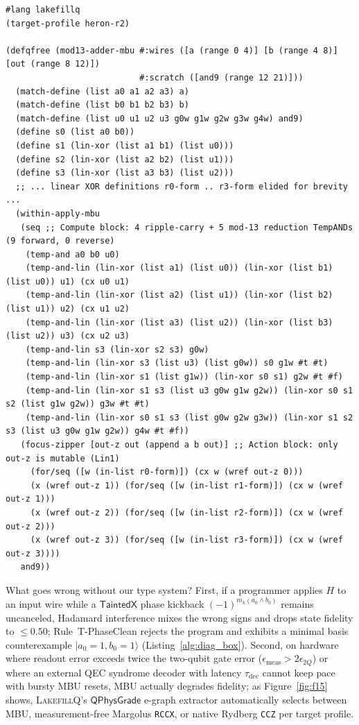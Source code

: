 \documentclass[acmsmall,screen,anonymous]{acmart}
\DeclareRobustCommand{\_}{\ifmmode\text{\char95}\else\char95\penalty0\relax\fi}
\theoremstyle{plain}
\newcommand{\LakefillQ}{\textsc{LakefillQ}}
\newcommand{\QPhysGrade}{\ensuremath{\mathsf{QPhysGrade}}}
\newcommand{\CapTaintedX}{\ensuremath{\mathsf{TaintedX}}}
\begin{document}
\begin{lstlisting}[language=LakefillLisp,caption={Modulo-13 adder in \texttt{\#lang lakefillq} (\texttt{examples/mod13\_adder\_mbu.lfq}): \texttt{focus-zipper} isolates mutation to \texttt{out}, while \texttt{within-apply-mbu} halves \texttt{TempAND} count from 18 to 9 with zero annotations.},label={alg:a16}]
#lang lakefillq
(target-profile heron-r2)

(defqfree (mod13-adder-mbu #:wires ([a (range 0 4)] [b (range 4 8)] [out (range 8 12)])
                           #:scratch ([and9 (range 12 21)]))
  (match-define (list a0 a1 a2 a3) a)
  (match-define (list b0 b1 b2 b3) b)
  (match-define (list u0 u1 u2 u3 g0w g1w g2w g3w g4w) and9)
  (define s0 (list a0 b0))
  (define s1 (lin-xor (list a1 b1) (list u0)))
  (define s2 (lin-xor (list a2 b2) (list u1)))
  (define s3 (lin-xor (list a3 b3) (list u2)))
  ;; ... linear XOR definitions r0-form .. r3-form elided for brevity ...
  (within-apply-mbu
   (seq ;; Compute block: 4 ripple-carry + 5 mod-13 reduction TempANDs (9 forward, 0 reverse)
    (temp-and a0 b0 u0)
    (temp-and-lin (lin-xor (list a1) (list u0)) (lin-xor (list b1) (list u0)) u1) (cx u0 u1)
    (temp-and-lin (lin-xor (list a2) (list u1)) (lin-xor (list b2) (list u1)) u2) (cx u1 u2)
    (temp-and-lin (lin-xor (list a3) (list u2)) (lin-xor (list b3) (list u2)) u3) (cx u2 u3)
    (temp-and-lin s3 (lin-xor s2 s3) g0w)
    (temp-and-lin (lin-xor s3 (list u3) (list g0w)) s0 g1w #t #t)
    (temp-and-lin (lin-xor s1 (list g1w)) (lin-xor s0 s1) g2w #t #f)
    (temp-and-lin (lin-xor s1 s3 (list u3 g0w g1w g2w)) (lin-xor s0 s1 s2 (list g1w g2w)) g3w #t #t)
    (temp-and-lin (lin-xor s0 s1 s3 (list g0w g2w g3w)) (lin-xor s1 s2 s3 (list u3 g0w g1w g2w)) g4w #t #f))
   (focus-zipper [out-z out (append a b out)] ;; Action block: only out-z is mutable (Lin1)
     (for/seq ([w (in-list r0-form)]) (cx w (wref out-z 0)))
     (x (wref out-z 1)) (for/seq ([w (in-list r1-form)]) (cx w (wref out-z 1)))
     (x (wref out-z 2)) (for/seq ([w (in-list r2-form)]) (cx w (wref out-z 2)))
     (x (wref out-z 3)) (for/seq ([w (in-list r3-form)]) (cx w (wref out-z 3))))
   and9))
\end{lstlisting}

What goes wrong without our type system? First, if a programmer applies $H$ to an input wire while a $\CapTaintedX$ phase kickback $(-1)^{m_k (a_0 \land b_0)}$ remains uncanceled, Hadamard interference mixes the wrong signs and drops state fidelity to $\le 0.50$; Rule~\textsf{T-PhaseClean} rejects the program and exhibits a minimal basis counterexample $|a_0 = 1, b_0 = 1\rangle$ (Listing~\ref{alg:diag_box}). Second, on hardware where readout error exceeds twice the two-qubit gate error ($\epsilon_{\mathrm{meas}} > 2\epsilon_{2Q}$) or where an external QEC syndrome decoder with latency $\tau_{\mathrm{dec}}$ cannot keep pace with bursty MBU resets, MBU actually degrades fidelity; as Figure~\ref{fig:f15} shows, \LakefillQ{}'s $\QPhysGrade$ e-graph extractor automatically selects between MBU, measurement-free Margolus \texttt{RCCX}, or native Rydberg \texttt{CCZ} per target profile.
\end{document}
